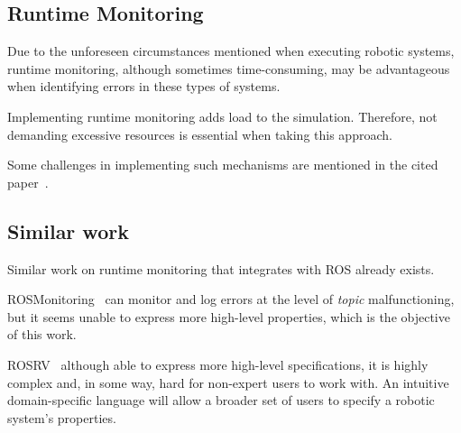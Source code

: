 \subsection{Runtime Monitoring}

Due to the unforeseen circumstances mentioned when executing robotic systems, runtime monitoring, although sometimes time-consuming, may be advantageous when identifying errors in these types of systems.

Implementing runtime monitoring adds load to the simulation. Therefore, not demanding excessive resources is essential when taking this approach.

Some challenges in implementing such mechanisms are mentioned in the cited paper~\cite{stadler2022towards}.

\subsection{Similar work}

Similar work on runtime monitoring that integrates with ROS already exists. 

ROSMonitoring~\cite{ferrando2020rosmonitoring} can monitor and log errors at the level of \textit{topic} malfunctioning, but it seems unable to express more high-level properties, which is the objective of this work.

ROSRV~\cite{huang2014rosrv} although able to express more high-level specifications, it is highly complex and, in some way, hard for non-expert users to work with. An intuitive domain-specific language will allow a broader set of users to specify a robotic system's properties.

